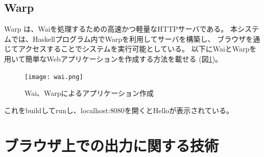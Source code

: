 \documentclass{cssspaper}
\begin{document}
            \subsection{Warp}
            Warp \cite{14} は、Waiを処理するための高速かつ軽量なHTTPサーバである。  
            本システムでは、Haskellプログラム内でWarpを利用してサーバを構築し、
            ブラウザを通じてアクセスすることでシステムを実行可能としている。
            以下にWaiとWarpを用いて簡単なWebアプリケーションを作成する方法を載せる (図\ref{fig:warp})。

            \begin{figure}[h]
                \texttt{[image: wai.png]}
                \caption{Wai、Warpによるアプリケーション作成}
                \label{fig:warp}
            \end{figure}

             これをbuildしてrunし、localhost:8080を開くとHelloが表示されている。

            
        \section{ブラウザ上での出力に関する技術}
\end{document}
